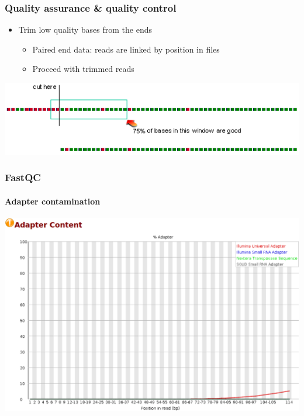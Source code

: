 \documentclass{beamer}			  %
\begin{document}
\begin{frame}
\frametitle{Quality assurance \& quality control}
	\begin{itemize}
		\item Trim low quality bases from the ends
		\begin{itemize}
			\item Paired end data: reads are linked by position in
files
			\item Proceed with trimmed reads
		\end{itemize}
	\end{itemize}
	\begin{center}
		\includegraphics[width=\textwidth]{figures/dge_03dp.png}
	\end{center}
\end{frame}


\begin{frame}
\frametitle{FastQC}
\framesubtitle{Adapter contamination}
	\begin{center}
		\includegraphics[height=0.75\textheight]{figures/dge_04p.png}
	\end{center}
\end{frame}
\end{document}
